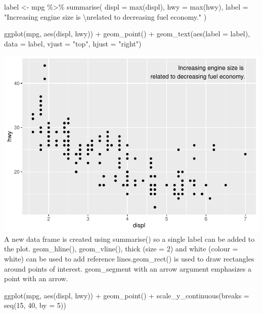 \documentclass[
]{article}
\newenvironment{Shaded}{\begin{snugshade}}{\end{snugshade}}
\newcommand{\AttributeTok}[1]{\textcolor[rgb]{0.77,0.63,0.00}{#1}}
\newcommand{\DecValTok}[1]{\textcolor[rgb]{0.00,0.00,0.81}{#1}}
\newcommand{\FunctionTok}[1]{\textcolor[rgb]{0.00,0.00,0.00}{#1}}
\newcommand{\NormalTok}[1]{#1}
\newcommand{\OtherTok}[1]{\textcolor[rgb]{0.56,0.35,0.01}{#1}}
\newcommand{\SpecialCharTok}[1]{\textcolor[rgb]{0.00,0.00,0.00}{#1}}
\newcommand{\StringTok}[1]{\textcolor[rgb]{0.31,0.60,0.02}{#1}}
\begin{document}
\begin{Shaded}
\begin{Highlighting}[]
\NormalTok{label }\OtherTok{\textless{}{-}}\NormalTok{ mpg }\SpecialCharTok{\%\textgreater{}\%}
  \FunctionTok{summarise}\NormalTok{(}
    \AttributeTok{displ =} \FunctionTok{max}\NormalTok{(displ),}
    \AttributeTok{hwy =} \FunctionTok{max}\NormalTok{(hwy),}
    \AttributeTok{label =} \StringTok{"Increasing engine size is }\SpecialCharTok{\textbackslash{}n}\StringTok{related to decreasing fuel economy."}
\NormalTok{  )}

\FunctionTok{ggplot}\NormalTok{(mpg, }\FunctionTok{aes}\NormalTok{(displ, hwy)) }\SpecialCharTok{+}
  \FunctionTok{geom\_point}\NormalTok{() }\SpecialCharTok{+}
  \FunctionTok{geom\_text}\NormalTok{(}\FunctionTok{aes}\NormalTok{(}\AttributeTok{label =}\NormalTok{ label), }\AttributeTok{data =}\NormalTok{ label, }\AttributeTok{vjust =} \StringTok{"top"}\NormalTok{, }\AttributeTok{hjust =} \StringTok{"right"}\NormalTok{)}
\end{Highlighting}
\end{Shaded}

\includegraphics{Assignments_files/figure-latex/unnamed-chunk-61-1.pdf}
A new data frame is created using summarise() so a single label can be
added to the plot. geom\_hline(), geom\_vline(), thick (size = 2) and
white (colour = white) can be used to add reference lines.geom\_rect()
is used to draw rectangles around points of interest. geom\_segment with
an arrow argument emphasizes a point with an arrow.

\begin{Shaded}
\begin{Highlighting}[]
\FunctionTok{ggplot}\NormalTok{(mpg, }\FunctionTok{aes}\NormalTok{(displ, hwy)) }\SpecialCharTok{+}
  \FunctionTok{geom\_point}\NormalTok{() }\SpecialCharTok{+}
  \FunctionTok{scale\_y\_continuous}\NormalTok{(}\AttributeTok{breaks =} \FunctionTok{seq}\NormalTok{(}\DecValTok{15}\NormalTok{, }\DecValTok{40}\NormalTok{, }\AttributeTok{by =} \DecValTok{5}\NormalTok{))}
\end{Highlighting}
\end{Shaded}
\end{document}

